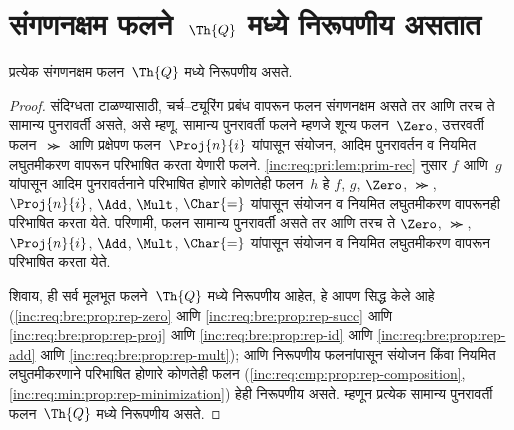 \section{संगणनक्षम फलने~$\Th{Q}$ मध्ये निरूपणीय असतात}\label{inc:req:crq:sec}

\begin{thm}
प्रत्येक संगणनक्षम फलन~$\Th{Q}$ मध्ये निरूपणीय असते.
\end{thm}

\begin{proof}
संदिग्धता टाळण्यासाठी, चर्च--ट्यूरिंग प्रबंध वापरून फलन
संगणनक्षम असते तर आणि तरच ते सामान्य पुनरावर्ती असते,
असे म्हणू. सामान्य पुनरावर्ती फलने म्हणजे शून्य फलन~$\Zero$,
उत्तरवर्ती फलन~$\Succ$ आणि प्रक्षेपण फलन~$\Proj{n}{i}$
यांपासून संयोजन, आदिम पुनरावर्तन व नियमित लघुतमीकरण वापरून
परिभाषित करता येणारी फलने. \ref{inc:req:pri:lem:prim-rec} नुसार
$f$ आणि~$g$ यांपासून आदिम पुनरावर्तनाने परिभाषित होणारे
कोणतेही फलन~$h$ हे $f$, $g$, $\Zero$,
$\Succ$, $\Proj{n}{i}$, $\Add$, $\Mult$, $\Char{=}$
यांपासून संयोजन व नियमित लघुतमीकरण वापरूनही परिभाषित
करता येते. परिणामी, फलन सामान्य पुनरावर्ती असते तर आणि तरच ते $\Zero$, $\Succ$, $\Proj{n}{i}$, $\Add$,
$\Mult$, $\Char{=}$ यांपासून संयोजन व नियमित लघुतमीकरण
वापरून परिभाषित करता येते.

शिवाय, ही सर्व मूलभूत फलने~$\Th{Q}$ मध्ये निरूपणीय आहेत,
हे आपण सिद्ध केले आहे
(\ref{inc:req:bre:prop:rep-zero} आणि \ref{inc:req:bre:prop:rep-succ} आणि \ref{inc:req:bre:prop:rep-proj} आणि \ref{inc:req:bre:prop:rep-id} आणि \ref{inc:req:bre:prop:rep-add} आणि \ref{inc:req:bre:prop:rep-mult});
आणि निरूपणीय फलनांपासून संयोजन किंवा नियमित लघुतमीकरणाने
परिभाषित होणारे कोणतेही फलन
(\ref{inc:req:cmp:prop:rep-composition},
\ref{inc:req:min:prop:rep-minimization}) हेही निरूपणीय असते.
म्हणून प्रत्येक सामान्य पुनरावर्ती फलन~$\Th{Q}$ मध्ये
निरूपणीय असते.
\end{proof}

